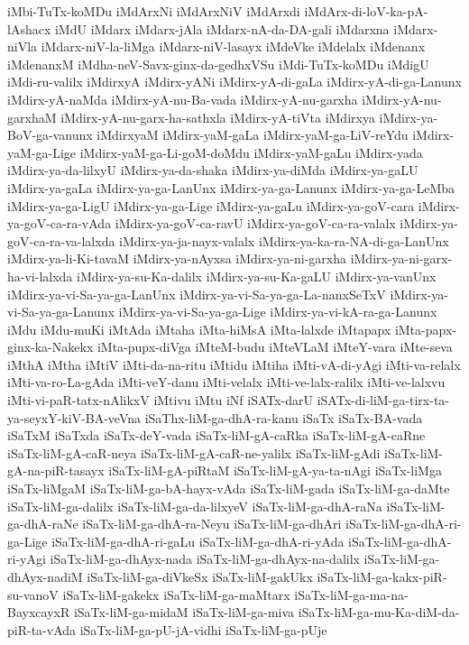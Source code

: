 {iMbi-TuTx-koMDu
iMdArxNi
iMdArxNiV
iMdArxdi
iMdArx-di-loV-ka-pA-lAshacx
iMdU
iMdarx
iMdarx-jAla
iMdarx-nA-da-DA-gali
iMdarxna
iMdarx-niVla
iMdarx-niV-la-liMga
iMdarx-niV-lasayx
iMdeVke
iMdelalx
iMdenanx
iMdenanxM
iMdha-neV-Savx-ginx-da-gedhxVSu
iMdi-TuTx-koMDu
iMdigU
iMdi-ru-valilx
iMdirxyA
iMdirx-yANi
iMdirx-yA-di-gaLa
iMdirx-yA-di-ga-Lanunx
iMdirx-yA-naMda
iMdirx-yA-nu-Ba-vada
iMdirx-yA-nu-garxha
iMdirx-yA-nu-garxhaM
iMdirx-yA-nu-garx-ha-sathxla
iMdirx-yA-tiVta
iMdirxya
iMdirx-ya-BoV-ga-vanunx
iMdirxyaM
iMdirx-yaM-gaLa
iMdirx-yaM-ga-LiV-reYdu
iMdirx-yaM-ga-Lige
iMdirx-yaM-ga-Li-goM-doMdu
iMdirx-yaM-gaLu
iMdirx-yada
iMdirx-ya-da-lilxyU
iMdirx-ya-da-shaka
iMdirx-ya-diMda
iMdirx-ya-gaLU
iMdirx-ya-gaLa
iMdirx-ya-ga-LanUnx
iMdirx-ya-ga-Lanunx
iMdirx-ya-ga-LeMba
iMdirx-ya-ga-LigU
iMdirx-ya-ga-Lige
iMdirx-ya-gaLu
iMdirx-ya-goV-cara
iMdirx-ya-goV-ca-ra-vAda
iMdirx-ya-goV-ca-ravU
iMdirx-ya-goV-ca-ra-valalx
iMdirx-ya-goV-ca-ra-va-lalxda
iMdirx-ya-ja-nayx-valalx
iMdirx-ya-ka-ra-NA-di-ga-LanUnx
iMdirx-ya-li-Ki-tavaM
iMdirx-ya-nAyxsa
iMdirx-ya-ni-garxha
iMdirx-ya-ni-garx-ha-vi-lalxda
iMdirx-ya-su-Ka-dalilx
iMdirx-ya-su-Ka-gaLU
iMdirx-ya-vanUnx
iMdirx-ya-vi-Sa-ya-ga-LanUnx
iMdirx-ya-vi-Sa-ya-ga-La-nanxSeTxV
iMdirx-ya-vi-Sa-ya-ga-Lanunx
iMdirx-ya-vi-Sa-ya-ga-Lige
iMdirx-ya-vi-kA-ra-ga-Lanunx
iMdu
iMdu-muKi
iMtAda
iMtaha
iMta-hiMsA
iMta-lalxde
iMtapapx
iMta-papx-ginx-ka-Nakekx
iMta-pupx-diVga
iMteM-budu
iMteVLaM
iMteY-vara
iMte-seva
iMthA
iMtha
iMtiV
iMti-da-na-ritu
iMtidu
iMtiha
iMti-vA-di-yAgi
iMti-va-relalx
iMti-va-ro-La-gAda
iMti-veY-danu
iMti-velalx
iMti-ve-lalx-ralilx
iMti-ve-lalxvu
iMti-vi-paR-tatx-nAlikxV
iMtivu
iMtu
iNf
iSATx-darU
iSATx-di-liM-ga-tirx-ta-ya-seyxY-kiV-BA-veVna
iSaThx-liM-ga-dhA-ra-kanu
iSaTx
iSaTx-BA-vada
iSaTxM
iSaTxda
iSaTx-deY-vada
iSaTx-liM-gA-caRka
iSaTx-liM-gA-caRne
iSaTx-liM-gA-caR-neya
iSaTx-liM-gA-caR-ne-yalilx
iSaTx-liM-gAdi
iSaTx-liM-gA-na-piR-tasayx
iSaTx-liM-gA-piRtaM
iSaTx-liM-gA-ya-ta-nAgi
iSaTx-liMga
iSaTx-liMgaM
iSaTx-liM-ga-bA-hayx-vAda
iSaTx-liM-gada
iSaTx-liM-ga-daMte
iSaTx-liM-ga-dalilx
iSaTx-liM-ga-da-lilxyeV
iSaTx-liM-ga-dhA-raNa
iSaTx-liM-ga-dhA-raNe
iSaTx-liM-ga-dhA-ra-Neyu
iSaTx-liM-ga-dhAri
iSaTx-liM-ga-dhA-ri-ga-Lige
iSaTx-liM-ga-dhA-ri-gaLu
iSaTx-liM-ga-dhA-ri-yAda
iSaTx-liM-ga-dhA-ri-yAgi
iSaTx-liM-ga-dhAyx-nada
iSaTx-liM-ga-dhAyx-na-dalilx
iSaTx-liM-ga-dhAyx-nadiM
iSaTx-liM-ga-diVkeSx
iSaTx-liM-gakUkx
iSaTx-liM-ga-kakx-piR-su-vanoV
iSaTx-liM-gakekx
iSaTx-liM-ga-maMtarx
iSaTx-liM-ga-ma-na-BayxcayxR
iSaTx-liM-ga-midaM
iSaTx-liM-ga-miva
iSaTx-liM-ga-mu-Ka-diM-da-piR-ta-vAda
iSaTx-liM-ga-pU-jA-vidhi
iSaTx-liM-ga-pUje
}
